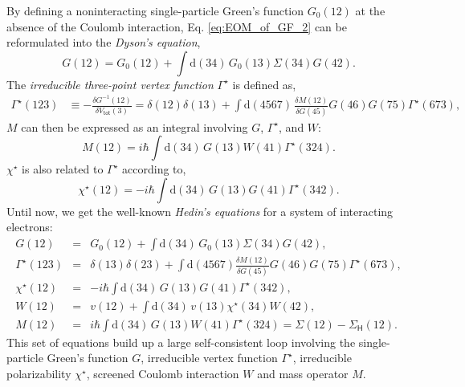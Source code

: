 \documentclass[11pt, oneside]{article}          %
\begin{document}
By defining a noninteracting single-particle Green's function $G_{0}(12)$ at the absence of the Coulomb interaction, Eq. \eqref{eq:EOM_of_GF_2} can be reformulated into the \emph{Dyson's equation},
\begin{equation}
  \label{eq:DysonEquation}
  G(12) = G_0(12) + \int \mathrm{d}(34) \, G_0(13) \Sigma (34) G(42).
\end{equation}
The \emph{irreducible three-point vertex function} $\Gamma^{\star}$ is defined as,
\begin{equation}
  \label{eq:def_vertex}
  \begin{aligned}
    \Gamma^{\star}(123) & \equiv - \frac{\delta G^{-1}(12)}{\delta V_{\mathsf{tot}}(3)} = \delta(12) \delta(13) + \int \mathrm{d}(4567) \, \frac{\delta M(12)}{\delta G(45)} G(46) G(75) \Gamma^{\star}(673),
  \end{aligned}
\end{equation}
$M$ can then be expressed as an integral involving $G$, $\Gamma^{\star}$, and $W$:
\begin{equation}
  \label{eq:Electron self-energy}
  M(12) = i \hbar \int \mathrm{d}(34) \, G(13) W(41) \Gamma^{\star}(324).
\end{equation}
$\chi^{\star}$ is also related to $\Gamma^{\star}$ according to,
\begin{equation}
  \label{eq:P_e(12)}
  \chi^{\star}(12) = - i \hbar \int \mathrm{d}(34) \, G(13) G(41)\Gamma^{\star}(342).
\end{equation}
Until now, we get the well-known \emph{Hedin's equations} \cite{hedin1965new,hedin1970effects} for a system of interacting electrons:
\begin{eqnarray}
  \label{eq:hedinsequation_1}
  G(12) & = & G_0(12) + \int \mathrm{d}(34) \, G_0(13) \Sigma (34) G(42), \\
  \label{eq:hedinsequation_2}
  \Gamma^{\star}(123) & = & \delta(13) \delta(23) + \int \mathrm{d} (4567) \frac{\delta M(12)}{\delta G(45)} G(46) G(75) \Gamma^{\star}(673), \\
  \label{eq:hedinsequation_3}
  \chi^{\star}(12) & = & - i \hbar \int \mathrm{d} (34) \, G(13) G(41) \Gamma^{\star}(342), \\
  \label{eq:hedinsequation_4}
  W(12) & = & v(12) + \int \mathrm{d} (34 )\, v(13) \chi^{\star}(34) W(42), \\
  \label{eq:hedinsequation_5}
  M(12) & = & i \hbar \int \mathrm{d}(34) \, G(13) W(41) \Gamma^{\star}(324) = \Sigma(12) - \Sigma_{\mathsf{H}}(12).
\end{eqnarray}
This set of equations build up a large self-consistent loop involving the single-particle Green's function $G$, irreducible vertex function $\Gamma^{\star}$, irreducible polarizability $\chi^{\star}$, screened Coulomb interaction $W$ and mass operator $M$.
\end{document}
